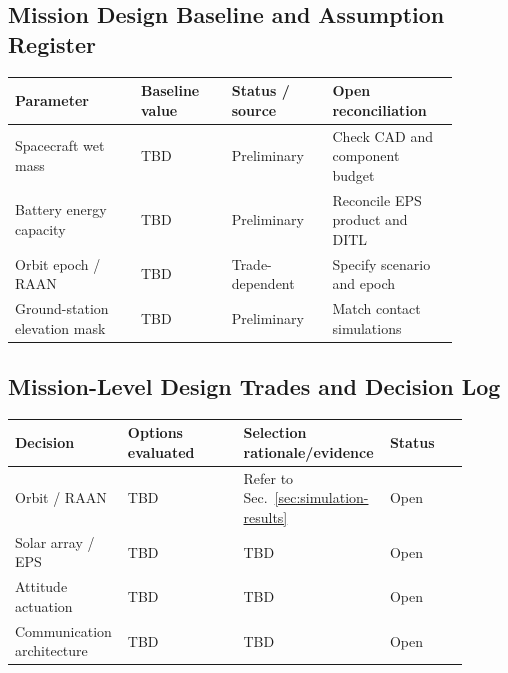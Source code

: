 
\subsection{Mission Design Baseline and Assumption Register}\label{sec:design-baseline}
\begin{longtable}{p{0.25\linewidth}p{0.18\linewidth}p{0.20\linewidth}p{0.25\linewidth}}
\toprule
Parameter & Baseline value & Status / source & Open reconciliation \\
\midrule
\endhead
Spacecraft wet mass & TBD & Preliminary & Check CAD and component budget \\
Battery energy capacity & TBD & Preliminary & Reconcile EPS product and DITL \\
Orbit epoch / RAAN & TBD & Trade-dependent & Specify scenario and epoch \\
Ground-station elevation mask & TBD & Preliminary & Match contact simulations \\
\bottomrule
\end{longtable}

\subsection{Mission-Level Design Trades and Decision Log}\label{sec:design-trades}
\begin{longtable}{p{0.22\linewidth}p{0.25\linewidth}p{0.26\linewidth}p{0.17\linewidth}}
\toprule
Decision & Options evaluated & Selection rationale/evidence & Status \\
\midrule
\endhead
Orbit / RAAN & TBD & Refer to Sec.~\ref{sec:simulation-results} & Open \\
Solar array / EPS & TBD & TBD & Open \\
Attitude actuation & TBD & TBD & Open \\
Communication architecture & TBD & TBD & Open \\
\bottomrule
\end{longtable}

